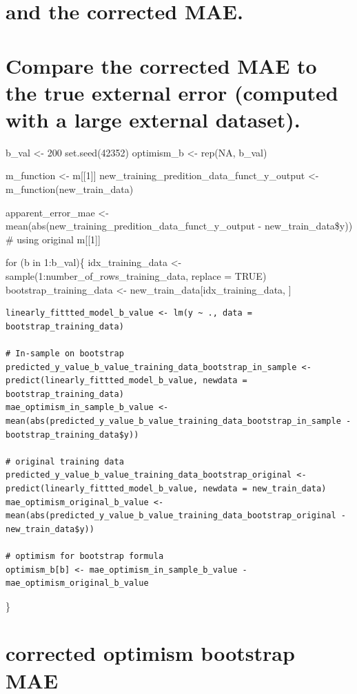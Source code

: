 \documentclass[
  letterpaper,
  DIV=11,
  numbers=noendperiod]{scrreprt}
\begin{document}
\chapter{and the corrected MAE.}\label{and-the-corrected-mae.}


\chapter{Compare the corrected MAE to the true external error (computed
with a large external
dataset).}\label{compare-the-corrected-mae-to-the-true-external-error-computed-with-a-large-external-dataset.}

b\_val \textless- 200 set.seed(42352) optimism\_b \textless- rep(NA,
b\_val)

m\_function \textless- m{[}{[}1{]}{]}
new\_training\_predition\_data\_funct\_y\_output \textless-
m\_function(new\_train\_data)

apparent\_error\_mae \textless-
mean(abs(new\_training\_predition\_data\_funct\_y\_output -
new\_train\_data\$y)) \# using original m{[}{[}1{]}{]}

for (b in 1:b\_val)\{ idx\_training\_data \textless-
sample(1:number\_of\_rows\_training\_data, replace = TRUE)
bootstrap\_training\_data \textless-
new\_train\_data{[}idx\_training\_data, {]}

\begin{verbatim}
linearly_fittted_model_b_value <- lm(y ~ ., data = bootstrap_training_data)

# In-sample on bootstrap
predicted_y_value_b_value_training_data_bootstrap_in_sample <- predict(linearly_fittted_model_b_value, newdata = bootstrap_training_data)
mae_optimism_in_sample_b_value <- mean(abs(predicted_y_value_b_value_training_data_bootstrap_in_sample - bootstrap_training_data$y))

# original training data
predicted_y_value_b_value_training_data_bootstrap_original <- predict(linearly_fittted_model_b_value, newdata = new_train_data)
mae_optimism_original_b_value <- mean(abs(predicted_y_value_b_value_training_data_bootstrap_original - new_train_data$y))

# optimism for bootstrap formula
optimism_b[b] <- mae_optimism_in_sample_b_value - mae_optimism_original_b_value
\end{verbatim}

\}


\chapter{corrected optimism bootstrap
MAE}\label{corrected-optimism-bootstrap-mae}
\end{document}
